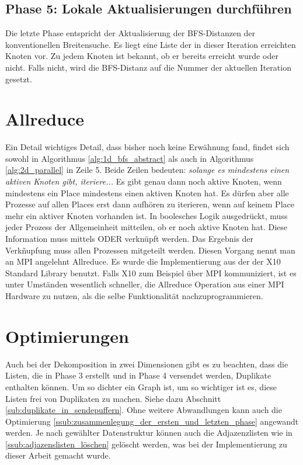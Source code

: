 \subsection{Phase 5: Lokale Aktualisierungen durchführen} %
\label{ssub:lokale_updates_durchf_hren}
Die letzte Phase entspricht der Aktualisierung der BFS-Distanzen der konventionellen Breitensuche. Es liegt eine Liste der in dieser Iteration erreichten Knoten vor. Zu jedem Knoten ist bekannt, ob er bereits erreicht wurde oder nicht. Falls nicht, wird die BFS-Distanz auf die Nummer der aktuellen Iteration gesetzt.

\section{Allreduce} %
\label{sub:allreduce}
Ein Detail wichtiges Detail, dass bisher noch keine Erwähnung fand, findet sich sowohl in Algorithmus \ref{alg:1d_bfs_abstract} als auch in Algorithmus \ref{alg:2d_parallel} in Zeile 5. Beide Zeilen bedeuten: \textit{solange es mindestens einen aktiven Knoten gibt, iteriere...} Es gibt genau dann noch aktive Knoten, wenn mindestens ein Place mindestens einen aktiven Knoten hat. Es dürfen aber alle Prozesse auf allen Places erst dann aufhören zu iterieren, wenn auf keinem Place mehr ein aktiver Knoten vorhanden ist. In boolesches Logik ausgedrückt, muss jeder Prozess der Allgemeinheit mitteilen, ob er noch aktive Knoten hat. Diese Information muss mittels ODER verknüpft werden. Das Ergebnis der Verkñupfung muss allen Prozessen mitgeteilt werden. Diesen Vorgang nennt man an MPI angelehnt Allreduce. Es wurde die Implementierung aus der der X10 Standard Library benutzt. Falls X10 zum Beispiel über MPI kommuniziert, ist es unter Umständen wesentlich schneller, die Allreduce Operation aus einer MPI Hardware zu nutzen, als die selbe Funktionalität nachzuprogrammieren.  

\section{Optimierungen} %
\label{sec:optimierungen}
Auch bei der Dekomposition in zwei Dimensionen gibt es zu beachten, dass die Listen, die in Phase 3 erstellt und in Phase 4 versendet werden, Duplikate enthalten können. Um so dichter ein Graph ist, um so wichtiger ist es, diese Listen frei von Duplikaten zu machen. Siehe dazu Abschnitt \ref{sub:duplikate_in_sendepuffern}. Ohne weitere Abwandlungen kann auch die Optimierung \ref{ssub:zusammenlegung_der_ersten_und_letzten_phase} angewandt werden. Je nach gewählter Datenstruktur können auch die Adjazenzlisten wie in \ref{ssub:adjazenslisten_löschen} gelöscht werden, was bei der Implementierung zu dieser Arbeit gemacht wurde. 
